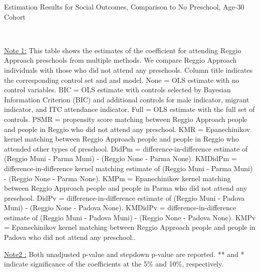 \begin{table}[H] \caption{Estimation Results for Social Outcomes, Comparison to No Preschool, Age-30 Cohort} \label{ols-S-adult30-reg-none}
\scalebox{0.6}{}
\vspace{1ex} \\
\footnotesize\raggedright{\underline{Note 1:} This table shows the estimates of the coefficient for attending Reggio Approach preschools from multiple methods. We compare Reggio Approach individuals with those who did not attend any preschools. Column title indicates the corresponding control set and and model. None = OLS estimate with no control variables. BIC = OLS estimate with controls selected by Bayesian Information Criterion (BIC) and additional controls for male indicator, migrant indicator, and ITC attendance indicator. Full = OLS estimate with the full set of controls. PSMR =  propensity score matching between Reggio Approach people and people in Reggio who did not attend any preschool. KMR = Epanechinikov kernel matching between Reggio Approach people and people in Reggio who attended other types of preschool. DidPm = difference-in-difference estimate of (Reggio Muni - Parma Muni) - (Reggio None - Parma None). KMDidPm = difference-in-difference kernel matching estimate of (Reggio Muni - Parma Muni) - (Reggio None - Parma None). KMPm = Epanechinikov kernel matching between Reggio Approach people and people in Parma who did not attend any preschool. DidPv = difference-in-difference estimate of (Reggio Muni - Padova Muni) - (Reggio None - Padova None). KMDidPv = difference-in-difference estimate of (Reggio Muni - Padova Muni) - (Reggio None - Padova None). KMPv = Epanechinikov kernel matching between Reggio Approach people and people in Padova who did not attend any preschool..}

\footnotesize\raggedright{\underline{Note2 :} Both unadjusted p-value and stepdown p-value are reported. ** and * indicate significance of the coefficients at the 5\% and 10\%, respectively.}
\end{table}













